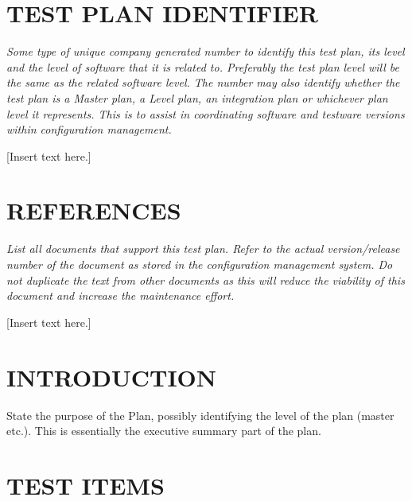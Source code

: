 \bigskip
\setcounter{page}{1}\pagestyle{Convertiv}

\section[IDENTIFIER]{\bfseries\color{black}
TEST PLAN IDENTIFIER}

{\itshape\color{black}
Some type of unique company generated number to identify this test
plan, its level and the level of software that it is related
to. Preferably the test plan level will be the same as the related
software level. The number may also identify whether the test plan is
a Master plan, a Level plan, an integration plan or whichever plan
level it represents. This is to assist in coordinating software and
testware versions within configuration management.
}

{\color{black}
[Insert text here.]}


\section[REFERENCES]{\bfseries\color{black}
REFERENCES}

{\itshape\color{black}
List all documents that support this test plan. Refer to the actual
version/release number of the document as stored in the configuration
management system. Do not duplicate the text from other documents as
this will reduce the viability of this document and increase the
maintenance effort.
}

{\color{black}
[Insert text here.]}



\section[INTRODUCTION]{\bfseries\color{black} INTRODUCTION}

{\itshape\color{black}

State the purpose of the Plan, possibly identifying the level of the
plan (master etc.). This is essentially the executive summary part of
the plan. 

}

\section[TEST ITEMS]{\bfseries\color{black} TEST ITEMS}

